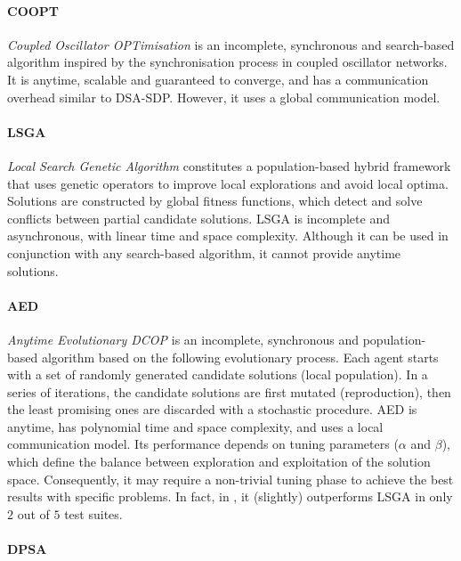 \paragraph{COOPT}

\emph{Coupled Oscillator OPTimisation} \cite{leite2019b}
is an incomplete, synchronous and search-based algorithm inspired by the synchronisation
process in coupled oscillator networks. It is anytime, scalable and guaranteed to
converge, and has a communication overhead similar to DSA-SDP. However, it uses a global
communication model.

\paragraph{LSGA}

\emph{Local Search Genetic Algorithm} \cite{chen2020lsga}
constitutes a population-based hybrid framework that uses genetic operators to improve
local explorations and avoid local optima. Solutions are constructed by global fitness
functions, which detect and solve conflicts between partial candidate solutions. LSGA is
incomplete and asynchronous, with linear time and space complexity. Although it can be
used in conjunction with any search-based algorithm,
it cannot provide anytime solutions.

\paragraph{AED}

\emph{Anytime Evolutionary DCOP} \cite{mahmud2020a}
is an incomplete, synchronous and population-based algorithm based on the following
evolutionary process. Each agent starts with a set of randomly generated candidate
solutions (local population). In a series of iterations, the candidate solutions are first
mutated (reproduction), then the least promising ones are discarded with a stochastic
procedure. AED is anytime, has polynomial time and space complexity, and uses a local
communication model. Its performance depends on tuning parameters ($\alpha$ and $\beta$),
which define the balance between exploration and exploitation of the solution space.
Consequently, it may require a non-trivial tuning phase to achieve the best results with
specific problems. In fact, in \cite{mahmud2020b}, it (slightly) outperforms LSGA in only
$2$ out of $5$ test suites.
\clearpage

\paragraph{DPSA}

